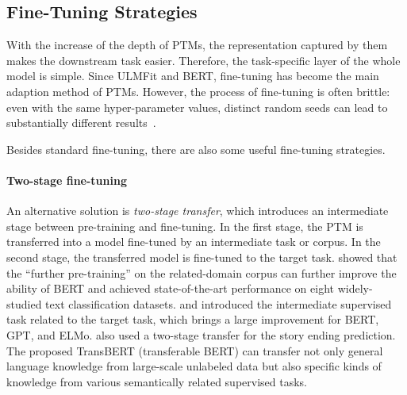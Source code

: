 \documentclass[fleqn]{SCYE-arxiv}
\begin{document}
\begin{multicols}{2}




\subsection{Fine-Tuning Strategies}


With the increase of the depth of PTMs, the representation captured by them makes the downstream task easier. Therefore, the task-specific layer of the whole model is simple.
Since ULMFit and BERT, fine-tuning has become the main adaption method of PTMs.
However, the process of fine-tuning is often brittle: even with the same hyper-parameter values, distinct random seeds can lead to substantially different results~\cite{dodge2020fine}.

Besides standard fine-tuning, there are also some useful fine-tuning strategies.

\paragraph{Two-stage fine-tuning}

An alternative solution is \textit{two-stage transfer}, which introduces an intermediate stage between pre-training and fine-tuning.
In the first stage, the PTM is transferred into a model fine-tuned by an intermediate task or corpus. In the second stage, the transferred model is fine-tuned to the target task.
\citet{sun2019fine} showed that the ``further pre-training'' on the related-domain corpus can further improve the ability of BERT and achieved state-of-the-art performance on eight widely-studied text classification datasets.
\citet{phang2018sentence} and \citet{garg2019tanda} introduced the intermediate supervised task related to the target task, which brings a large improvement for BERT, GPT, and ELMo. \citet{li2019story} also used a two-stage transfer for the story ending prediction.
The proposed TransBERT (transferable BERT) can transfer not only general language knowledge from large-scale unlabeled data but also specific kinds of knowledge from various semantically related supervised tasks.



\end{multicols}
\end{document}
